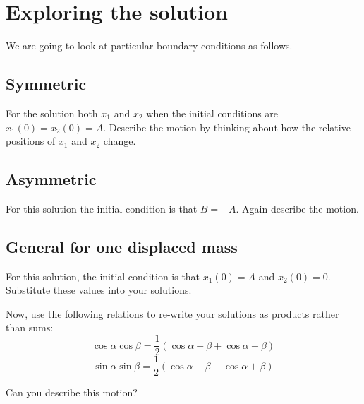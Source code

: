 \documentclass[a4paper]{article}
\begin{document}
\section*{Exploring the solution}
We are going to look at particular boundary conditions as follows.
\subsection*{Symmetric}
For the solution both $x_1$ and $x_2$ when the initial conditions are $x_1(0)=x_2(0)=A$.  Describe the motion by thinking about how the relative positions of $x_1$ and $x_2$ change.

\subsection*{Asymmetric}
For this solution the initial condition is that $B=-A$.  Again describe the motion.

\subsection*{General for one displaced mass}
For this solution, the initial condition is that $x_1(0) = A$ and $x_2(0) = 0$.  Substitute these values into your solutions.

Now, use the following relations to re-write your solutions as products rather than sums:
    \[ \cos{\alpha}\cos{\beta} = \frac{1}{2}\left(\cos{\alpha-\beta} + \cos{\alpha+\beta}\right) \]
    \[ \sin{\alpha}\sin{\beta} = \frac{1}{2}\left(\cos{\alpha-\beta} - \cos{\alpha+\beta}\right) \]

Can you describe this motion?
\end{document}
